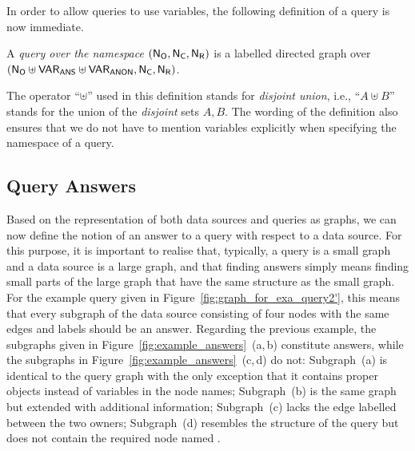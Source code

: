 In order to allow queries to use variables,
the following definition of a query is now immediate. 
%
\begin{definition}
  A \emph{query over the namespace $(\mathsf{N}_\mathsf{O},\mathsf{N}_\mathsf{C},\mathsf{N}_\mathsf{R})$} is a labelled directed graph
  over $(\mathsf{N}_\mathsf{O} \uplus \mathsf{VAR}_\mathsf{ANS} \uplus \mathsf{VAR}_\mathsf{ANON}, \mathsf{N}_\mathsf{C}, \mathsf{N}_\mathsf{R})$.
\end{definition}
%
The operator \enquote{$\uplus$} used in this definition
stands for \emph{disjoint union}, i.e., \enquote{$A \uplus B$}
stands for the union of the \emph{disjoint} sets $A,B$.
The wording of the definition also ensures
that we do not have to mention variables explicitly when specifying the
namespace of a query.

\subsection{Query Answers}

Based on the representation of both data sources and queries as graphs,
we can now define the notion of an answer to a query 
with respect to a data source. For this purpose, it is important to realise
that, typically, a query is a small graph and a data source is a large graph,
and that finding answers simply means finding small parts of the large graph
that have the same structure as the small graph.
For the example query given in Figure~\ref{fig:graph_for_exa_query2'},
this means that every subgraph of the data source consisting of four nodes
with the same edges and labels should be an answer.
Regarding the previous example, the subgraphs given in
Figure~\ref{fig:example_answers}~(a,\,b) constitute answers,
while the subgraphs in Figure~\ref{fig:example_answers}~(c,\,d) do not:
Subgraph~(a) is identical to the query graph with the only exception that it
contains proper objects instead of variables in the node names;
Subgraph~(b) is the same graph but extended with additional information;
Subgraph~(c) lacks the edge labelled  between the two owners;
Subgraph~(d) resembles the structure of the query but does not contain
the required node named .

